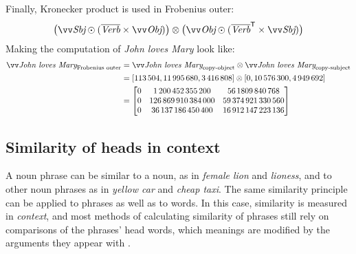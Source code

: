 Finally, Kronecker product is used in Frobenius outer:%
\begin{equation*}
  \big(\ov{\text{\it Sbj}} \odot (\overline{\text{\it Verb}} \times \ov{\text{\it Obj}})\big) \otimes %
  \big(\ov{\text{\it Obj}} \odot (\overline{\text{\it Verb}}^{\mathsf{T}} \times \ov{\text{\it Sbj}})\big)
\end{equation*}
%
Making the computation of \textit{John loves Mary} look like:
\begin{align*}
  \ov{\text{\it John loves Mary}}_{\text{Frobenius outer}} &=  \ov{\text{\it John loves Mary}}_{\text{copy-object}} \otimes \ov{\text{\it John loves Mary}}_{\text{copy-subject}}\\
                                                         &= [113\,504, 11\,995\,680,  3\,416\,808] \otimes [0, 10\,576\,300,  4\,949\,692] \\
                                                           &=%
                                                             \begin{bmatrix}
0 &   1\,200\,452\,355\,200 &      56\,1809\,840\,768 \\
0 & 126\,869\,910\,384\,000 &  59\,374\,921\,330\,560 \\
0 &  36\,137\,186\,450\,400 &  16\,912\,147\,223\,136 \\
                                                             \end{bmatrix}
\end{align*}


\subsection{Similarity of heads in context}
\label{sec:similarity-context}

A noun phrase can be similar to a noun, as in \textit{female lion} and \textit{lioness}, and to other noun phrases as in \textit{yellow car} and \textit{cheap taxi}. The same similarity principle can be applied to phrases as well as to words. In this case, similarity is measured in \emph{context},\footnotemark{} and most methods of calculating similarity of phrases still rely on comparisons of the phrases' head words, which meanings are modified by the arguments they appear with \cite{Kintsch2001173}.



